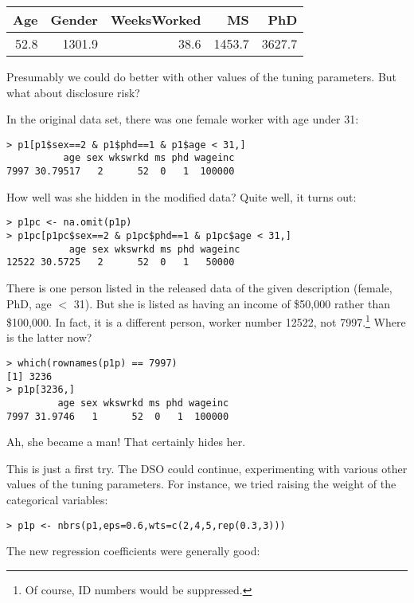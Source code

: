 \documentclass[11pt]{article}
\begin{document}
\begin{tabular}{|r|r|r|r|r|}
\hline
Age & Gender & WeeksWorked & MS & PhD \\ \hline 
52.8 & 1301.9 & 38.6 & 1453.7 & 3627.7 \\ \hline
\end{tabular}

Presumably we could do better with other values of the tuning
parameters.  But what about disclosure risk?

In the original data set, there was one female worker with age under 31:

\begin{lstlisting}
> p1[p1$sex==2 & p1$phd==1 & p1$age < 31,]
          age sex wkswrkd ms phd wageinc
7997 30.79517   2      52  0   1  100000
\end{lstlisting}

How well was she hidden in the modified data?  Quite well, it turns out:

\begin{lstlisting}
> p1pc <- na.omit(p1p)
> p1pc[p1pc$sex==2 & p1pc$phd==1 & p1pc$age < 31,]
           age sex wkswrkd ms phd wageinc
12522 30.5725   2      52  0   1   50000 
\end{lstlisting}

There is one person listed in the released data of the given description
(female, PhD, age $<$ 31).  But she is listed as having an income of
\$50,000 rather than \$100,000.  In fact, it is a different person, worker
number 12522, not 7997.\footnote{Of course, ID numbers would be suppressed.}
Where is the latter now?

\begin{lstlisting}
> which(rownames(p1p) == 7997)
[1] 3236
> p1p[3236,]
         age sex wkswrkd ms phd wageinc
7997 31.9746   1      52  0   1  100000
\end{lstlisting}

Ah, she became a man!  That certainly hides her.  

This is just a first try.  The DSO could continue, experimenting with
various other values of the tuning parameters.  For instance,
we tried raising the weight of the categorical variables:


\begin{lstlisting}
> p1p <- nbrs(p1,eps=0.6,wts=c(2,4,5,rep(0.3,3)))
\end{lstlisting}

The new regression coefficients were generally good:
\end{document}
